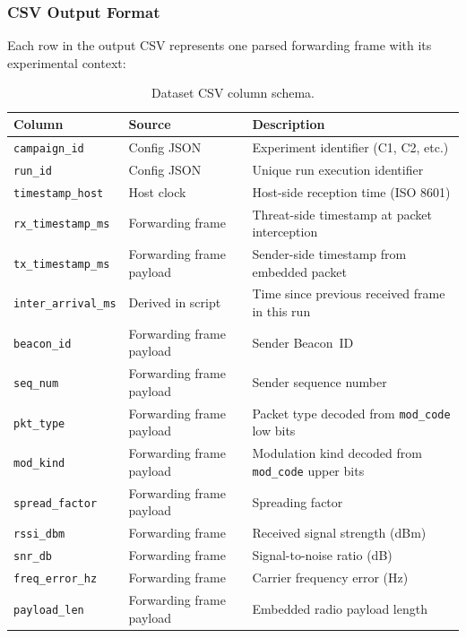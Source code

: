 \documentclass[11pt,letterpaper]{article}
\begin{document}
	\subsubsection{CSV Output Format}

	Each row in the output CSV represents one parsed forwarding frame with its experimental context:

	\begin{table}[ht!]
		\centering
		\caption{Dataset CSV column schema.}
		\label{tab:csv_schema}
		\renewcommand{\arraystretch}{1.3}
		\begin{tabularx}{\textwidth}{l l X}
			\toprule
			\textbf{Column} & \textbf{Source} & \textbf{Description} \\
			\midrule
			\texttt{campaign\_id} & Config JSON & Experiment identifier (C1, C2, etc.) \\
			\texttt{run\_id} & Config JSON & Unique run execution identifier \\
			\texttt{timestamp\_host} & Host clock & Host-side reception time (ISO 8601) \\
			\texttt{rx\_timestamp\_ms} & Forwarding frame & Threat-side timestamp at packet interception \\
			\texttt{tx\_timestamp\_ms} & Forwarding frame payload & Sender-side timestamp from embedded packet \\
			\texttt{inter\_arrival\_ms} & Derived in script & Time since previous received frame in this run \\
			\texttt{beacon\_id} & Forwarding frame payload & Sender Beacon~ID \\
			\texttt{seq\_num} & Forwarding frame payload & Sender sequence number \\
			\texttt{pkt\_type} & Forwarding frame payload & Packet type decoded from \texttt{mod\_code} low bits \\
			\texttt{mod\_kind} & Forwarding frame payload & Modulation kind decoded from \texttt{mod\_code} upper bits \\
			\texttt{spread\_factor} & Forwarding frame payload & Spreading factor \\
			\texttt{rssi\_dbm} & Forwarding frame & Received signal strength (dBm) \\
			\texttt{snr\_db} & Forwarding frame & Signal-to-noise ratio (dB) \\
			\texttt{freq\_error\_hz} & Forwarding frame & Carrier frequency error (Hz) \\
			\texttt{payload\_len} & Forwarding frame payload & Embedded radio payload length \\

\end{tabularx}
\end{table}
\end{document}
